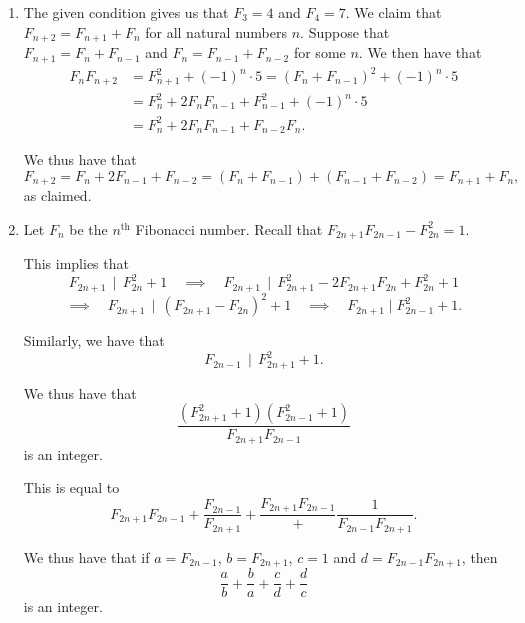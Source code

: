 \documentclass[12pt]{article}
\begin{document}
\begin{enumerate}
\item %
The given condition gives us that $F_3 = 4$ and $F_4 = 7$. We claim that $F_{n +
2} = F_{n + 1} + F_{n}$ for all natural numbers $n$. Suppose that $F_{n + 1} =
F_{n} + F_{n - 1}$ and $F_n = F_{n - 1} + F_{n - 2}$ for some $n$. We then have
that
\begin{align*}
  F_{n} F_{n + 2} & = F_{n + 1}^2 + {(-1)}^{n} \cdot 5 
     = {\left(F_n + F_{n - 1}\right)}^2 + {(-1)}^{n} \cdot 5 \\
     & = F_n^2 + 2 F_n F_{n-1} + F_{n - 1}^2 + {(-1)}^{n} \cdot 5 \\
     & = F_n^2 + 2F_n F_{n-1} + F_{n - 2} F_n. 
\end{align*}

We thus have that
\[
    F_{n + 2} = F_n + 2F_{n - 1} + F_{n - 2} = (F_n + F_{n - 1}) + (F_{n - 1} +
    F_{n - 2}) = F_{n + 1} + F_n,
\]
as claimed.

\item %
Let $F_n$ be the $n^\text{th}$ Fibonacci number. Recall that $F_{2n+1} F_{2n -
1} - F_{2n}^2 = 1.$

This implies that
\[
  F_{2n + 1} \,\mid\, F_{2n}^2 + 1 \quad \implies \quad F_{2n + 1} \,\mid\,
  F_{2n+1}^2 - 2 F_{2n + 1} F_{2n} + F_{2n}^2 + 1 
\]
\[
  \implies \quad F_{2n +
  1} \,\mid\, {\left( F_{2n+1} - F_{2n} \right)}^2 + 1 \quad \implies \quad
  F_{2n + 1} \mid F_{2n - 1}^2 + 1.
\]

Similarly, we have that
\[
  F_{2n - 1} \,\mid\, F_{2n + 1}^2 + 1.
\]

We thus have that
\[
  \frac{(F_{2n + 1}^2 + 1)(F_{2n - 1}^2 + 1)}{F_{2n + 1} F_{2n - 1}}
\]
is an integer.

This is equal to
\[
  F_{2n + 1} F_{2n - 1} + \frac{F_{2n - 1}}{F_{2n + 1}} + \frac{F_{2n + 1}F_{2n
  - 1}} + \frac{1}{F_{2n - 1}F_{2n + 1}}.
\]

We thus have that if $a = F_{2n - 1}$, $b = F_{2n + 1}$, $c = 1$ and $d = F_{2n
- 1} F_{2n + 1}$, then
\[
  \frac{a}{b} + \frac{b}{a} + \frac{c}{d} + \frac{d}{c}
\]
is an integer.


\end{enumerate}
\end{document}
